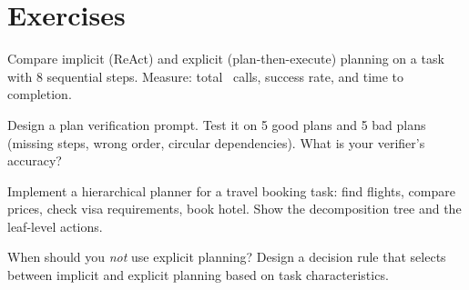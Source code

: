 \section{Exercises}

\begin{exercise}
	Compare implicit (ReAct) and explicit (plan-then-execute) planning on a task with 8 sequential steps. Measure: total \llm\ calls, success rate, and time to completion.
\end{exercise}

\begin{exercise}
	Design a plan verification prompt. Test it on 5 good plans and 5 bad plans (missing steps, wrong order, circular dependencies). What is your verifier's accuracy?
\end{exercise}

\begin{exercise}
	Implement a hierarchical planner for a travel booking task: find flights, compare prices, check visa requirements, book hotel. Show the decomposition tree and the leaf-level actions.
\end{exercise}

\begin{exercise}
	When should you \emph{not} use explicit planning? Design a decision rule that selects between implicit and explicit planning based on task characteristics.
\end{exercise}
